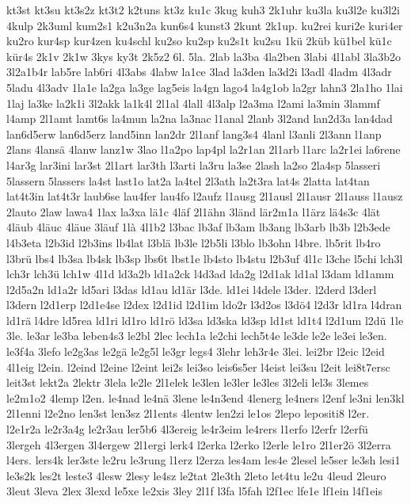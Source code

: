 {kt3st
kt3su
kt3s2z
kt3t2
k2tuns
kt3z
ku1c
3kug
kuh3
2k1uhr
ku3la
ku3l2e
ku3l2i
4kulp
2k3uml
kum2s1
k2u3n2a
kun6s4
kunst3
2kunt
2k1up.
ku2rei
kuri2e
kuri4er
ku2ro
kur4sp
kur4zen
ku4schl
ku2so
ku2sp
ku2s1t
ku2su
1kü
2küb
kü1bel
kü1c
kür4s
2k1v
2k1w
3kys
ky3t
2k5z2
6l.
5la.
2lab
la3ba
4la2ben
3labi
4l1abl
3la3b2o
3l2a1b4r
lab5re
lab6ri
4l3abs
4labw
la1ce
3lad
la3den
la3d2i
l3adl
4ladm
4l3adr
5ladu
4l3adv
1la1e
la2ga
la3ge
lag5eis
la4gn
lago4
la4g1ob
la2gr
lahn3
2la1ho
1lai
1laj
la3ke
la2k1i
3l2akk
la1k4l
2l1al
4lall
4l3alp
l2a3ma
l2ami
la3min
3lammf
l4amp
2l1amt
lamt6s
la4mun
la2na
la3nac
l1anal
2lanb
3l2and
lan2d3a
lan4dad
lan6d5erw
lan6d5erz
land5inn
lan2dr
2l1anf
lang3s4
4lanl
l3anli
2l3ann
l1anp
2lans
4lansä
4lanw
lanz1w
3lao
l1a2po
lap4pl
la2r1an
2l1arb
l1arc
la2r1ei
la6rene
l4ar3g
lar3ini
lar3st
2l1art
lar3th
l3arti
la3ru
la3se
2lash
la2so
2la4sp
5lasseri
5lassern
5lassers
la4st
last1o
lat2a
la4tel
2l3ath
la2t3ra
lat4s
2latta
lat4tan
lat4t3in
lat4t3r
laub6se
lau4fer
lau4fo
l2aufz
l1ausg
2l1ausl
2l1ausr
2l1auss
l1ausz
2lauto
2law
lawa4
1lax
la3xa
lä1c
4läf
2l1ähn
3länd
lär2m1a
l1ärz
lä4s3c
4lät
4läub
4läuc
4läue
3läuf
1là
4l1b2
l3bac
lb3af
lb3am
lb3ang
lb3arb
lb3b
l2b3ede
l4b3eta
l2b3id
l2b3ins
lb4lat
l3blä
lb3le
l2b5li
l3blo
lb3ohn
l4bre.
lb5rit
lb4ro
l3brü
lbs4
lb3sa
lb4sk
lb3sp
lbs6t
lbst1e
lb4sto
lb4stu
l2b3uf
4l1c
l3che
l5chi
lch3l
lch3r
lch3ü
lch1w
4l1d
ld3a2b
ld1a2ck
l4d3ad
lda2g
l2d1ak
ld1al
l3dam
ld1amm
l2d5a2n
ld1a2r
ld5ari
l3das
ld1au
ld1är
l3de.
ld1ei
l4dele
l3der.
l2derd
l3derl
l3dern
l2d1erp
l2d1e4se
l2dex
l2d1id
l2d1im
ldo2r
l3d2os
l3dö4
l2d3r
ld1ra
l4dran
ld1rä
l4dre
ld5rea
ld1ri
ld1ro
ld1rö
ld3sa
ld3ska
ld3sp
ld1st
ld1t4
l2d1um
l2dü
1le
3le.
le3ar
le3ba
leben4s3
le2bl
2lec
lech1a
le2chi
lech5t4e
le3de
le2e
le3ei
le3en.
le3f4a
3lefo
le2g3as
le2gä
le2g5l
le3gr
legs4
3lehr
leh3r4e
3lei.
lei2br
l2eic
l2eid
4l1eig
l2ein.
l2eind
l2eine
l2eint
lei2s
lei3so
leis6s5er
l4eist
lei3su
l2eit
lei8t7ersc
leit3st
lekt2a
2lektr
3lela
le2le
2l1elek
le3len
le3ler
le3les
3l2eli
lel3s
3lemes
le2m1o2
4lemp
l2en.
le4nad
le4nä
3lene
le4n3end
4lenerg
le4ners
l2enf
le3ni
len3kl
2l1enni
l2e2no
len3st
len3sz
2l1ents
4lentw
len2zi
le1os
2lepo
lepositi8
l2er.
l2e1r2a
le2r3a4g
le2r3au
ler5b6
4l3ereig
le4r3eim
le4rers
l1erfo
l2erfr
l2erfü
3lergeh
4l3ergen
3l4ergew
2l1ergi
lerk4
l2erka
l2erko
l2erle
le1ro
2l1er2ö
3l2erra
l4ers.
lers4k
ler3ste
le2ru
le3rung
l1erz
l2erza
les4am
les4e
2lesel
le5ser
le3sh
lesi1
le3s2k
les2t
leste3
4lesw
2lesy
le4sz
le2tat
2le3th
2leto
let4tu
le2u
4leud
2leuro
3leut
3leva
2lex
3lexd
le5xe
le2xis
3ley
2l1f
l3fa
l5fah
l2f1ec
lfe1e
lf1ein
l4f1eis
}
